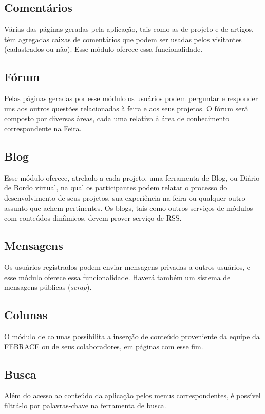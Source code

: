   \subsection{Comentários}
    Várias das páginas geradas pela aplicação, tais como as de projeto e de artigos, têm agregadas caixas de comentários que podem ser usadas pelos visitantes (cadastrados ou não). Esse módulo oferece essa funcionalidade.

  \subsection{Fórum}
    Pelas páginas geradas por esse módulo os usuários podem perguntar e responder uns aos outros questões relacionadas à feira e aos seus projetos. O fórum será composto por diversas áreas, cada uma relativa à área de conhecimento correspondente na Feira.

  \subsection{Blog}
    Esse módulo oferece, atrelado a cada projeto, uma ferramenta de Blog, ou Diário de Bordo virtual, na qual os participantes podem relatar o processo do desenvolvimento de seus projetos, sua experiência na feira ou qualquer outro assunto que achem pertinentes. Os blogs, tais como outros serviços de módulos com conteúdos dinâmicos, devem prover serviço de RSS.

  \subsection{Mensagens}
    Os usuários registrados podem enviar mensagens privadas a outros usuários, e esse módulo oferece essa funcionalidade. Haverá também um sistema de mensagens públicas (\textit{scrap}).

  \subsection{Colunas}
    O módulo de colunas possibilita a inserção de conteúdo proveniente da equipe da FEBRACE ou de seus colaboradores, em páginas com esse fim.

  \subsection{Busca}
    Além do acesso ao conteúdo da aplicação pelos menus correspondentes, é possível filtrá-lo por palavras-chave na ferramenta de busca.

